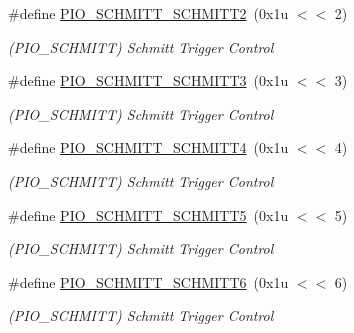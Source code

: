 \begin{DoxyCompactItemize}
\#define \mbox{\hyperlink{group__SAMS70__PIO_gad694f48d35253a97f0130c266a3ef205}{P\+I\+O\+\_\+\+S\+C\+H\+M\+I\+T\+T\+\_\+\+S\+C\+H\+M\+I\+T\+T2}}~(0x1u $<$$<$ 2)
\begin{DoxyCompactList}\small\item\em (P\+I\+O\+\_\+\+S\+C\+H\+M\+I\+TT) Schmitt Trigger Control \end{DoxyCompactList}\item 
\mbox{\label{group__SAMS70__PIO_ga053f84ed45ae60fe148f33d85d353b60}} 
\#define \mbox{\hyperlink{group__SAMS70__PIO_ga053f84ed45ae60fe148f33d85d353b60}{P\+I\+O\+\_\+\+S\+C\+H\+M\+I\+T\+T\+\_\+\+S\+C\+H\+M\+I\+T\+T3}}~(0x1u $<$$<$ 3)
\begin{DoxyCompactList}\small\item\em (P\+I\+O\+\_\+\+S\+C\+H\+M\+I\+TT) Schmitt Trigger Control \end{DoxyCompactList}\item 
\mbox{\label{group__SAMS70__PIO_ga1cbd90a2be60ddd28c33fd41b310fb03}} 
\#define \mbox{\hyperlink{group__SAMS70__PIO_ga1cbd90a2be60ddd28c33fd41b310fb03}{P\+I\+O\+\_\+\+S\+C\+H\+M\+I\+T\+T\+\_\+\+S\+C\+H\+M\+I\+T\+T4}}~(0x1u $<$$<$ 4)
\begin{DoxyCompactList}\small\item\em (P\+I\+O\+\_\+\+S\+C\+H\+M\+I\+TT) Schmitt Trigger Control \end{DoxyCompactList}\item 
\mbox{\label{group__SAMS70__PIO_ga980ce945c4767dd4b1d1b10c521fff97}} 
\#define \mbox{\hyperlink{group__SAMS70__PIO_ga980ce945c4767dd4b1d1b10c521fff97}{P\+I\+O\+\_\+\+S\+C\+H\+M\+I\+T\+T\+\_\+\+S\+C\+H\+M\+I\+T\+T5}}~(0x1u $<$$<$ 5)
\begin{DoxyCompactList}\small\item\em (P\+I\+O\+\_\+\+S\+C\+H\+M\+I\+TT) Schmitt Trigger Control \end{DoxyCompactList}\item 
\mbox{\label{group__SAMS70__PIO_ga9cf918b651ea14e01b8ddf8408c44eb0}} 
\#define \mbox{\hyperlink{group__SAMS70__PIO_ga9cf918b651ea14e01b8ddf8408c44eb0}{P\+I\+O\+\_\+\+S\+C\+H\+M\+I\+T\+T\+\_\+\+S\+C\+H\+M\+I\+T\+T6}}~(0x1u $<$$<$ 6)
\begin{DoxyCompactList}\small\item\em (P\+I\+O\+\_\+\+S\+C\+H\+M\+I\+TT) Schmitt Trigger Control \end{DoxyCompactList}\item 
$$
\end{DoxyCompactItemize}
